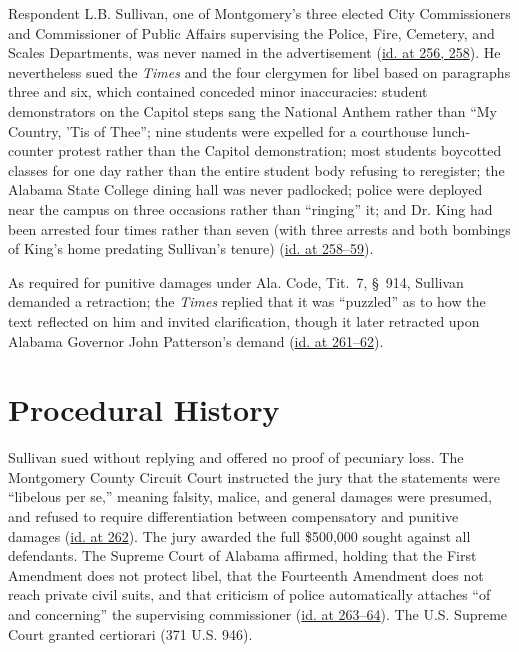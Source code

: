 \documentclass[12pt]{article}
\begin{document}
Respondent L.B. Sullivan, one of Montgomery's three elected City Commissioners and Commissioner of Public Affairs supervising the Police, Fire, Cemetery, and Scales Departments, was never named in the advertisement (\href{https://supreme.justia.com/cases/federal/us/376/254/}{id. at 256, 258}). He nevertheless sued the \textit{Times} and the four clergymen for libel based on paragraphs three and six, which contained conceded minor inaccuracies: student demonstrators on the Capitol steps sang the National Anthem rather than ``My Country, 'Tis of Thee''; nine students were expelled for a courthouse lunch-counter protest rather than the Capitol demonstration; most students boycotted classes for one day rather than the entire student body refusing to reregister; the Alabama State College dining hall was never padlocked; police were deployed near the campus on three occasions rather than ``ringing'' it; and Dr. King had been arrested four times rather than seven (with three arrests and both bombings of King's home predating Sullivan's tenure) (\href{https://www.law.cornell.edu/supremecourt/text/376/254}{id. at 258--59}).

As required for punitive damages under Ala. Code, Tit.~7, \S~914, Sullivan demanded a retraction; the \textit{Times} replied that it was ``puzzled'' as to how the text reflected on him and invited clarification, though it later retracted upon Alabama Governor John Patterson's demand (\href{https://supreme.justia.com/cases/federal/us/376/254/}{id. at 261--62}).

\section{Procedural History}
Sullivan sued without replying and offered no proof of pecuniary loss. The Montgomery County Circuit Court instructed the jury that the statements were ``libelous per se,'' meaning falsity, malice, and general damages were presumed, and refused to require differentiation between compensatory and punitive damages (\href{https://supreme.justia.com/cases/federal/us/376/254/}{id. at 262}). The jury awarded the full \$500,000 sought against all defendants. The Supreme Court of Alabama affirmed, holding that the First Amendment does not protect libel, that the Fourteenth Amendment does not reach private civil suits, and that criticism of police automatically attaches ``of and concerning'' the supervising commissioner (\href{https://supreme.justia.com/cases/federal/us/376/254/}{id. at 263--64}). The U.S. Supreme Court granted certiorari (371 U.S. 946).
\end{document}
